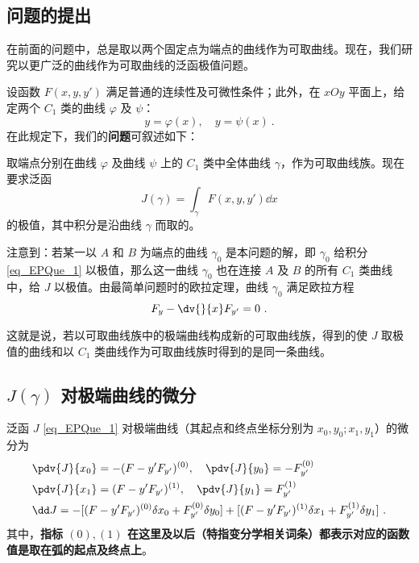 

\subsection{问题的提出}\label{sub_EPQue_1}在前面的问题中，总是取以两个固定点为端点的曲线作为可取曲线。现在，我们研究以更广泛的曲线作为可取曲线的泛函极值问题。

设函数 $F(x,y,y')$ 满足普通的连续性及可微性条件；此外，在 $xOy$ 平面上，给定两个 $C_1$ 类的曲线 $\varphi$ 及 $\psi$：
\begin{equation}
y=\varphi(x),\quad y=\psi(x)~.
\end{equation}
在此规定下，我们的\textbf{问题}可叙述如下：

取端点分别在曲线 $\varphi$ 及曲线 $\psi$ 上的 $C_1$ 类中全体曲线 $\gamma$，作为可取曲线族。现在要求泛函
\begin{equation}\label{eq_EPQue_1}
J(\gamma)=\int_\gamma F(x,y,y')\dd x
\end{equation}
的极值，其中积分是沿曲线 $\gamma$ 而取的。

注意到：若某一以 $A$ 和 $B$ 为端点的曲线 $\gamma_0$ 是本问题的解，即 $\gamma_0$ 给积分\autoref{eq_EPQue_1} 以极值，那么这一曲线 $\gamma_0$ 也在连接 $A$ 及 $B$ 的所有 $C_1$ 类曲线中，给 $J$ 以极值。由最简单问题时的欧拉定理，曲线 $\gamma_0$ 满足欧拉方程
\begin{equation}
F_y-\dv{}{x}F_{y'}=0~.
\end{equation}

这就是说，若以可取曲线族中的极端曲线构成新的可取曲线族，得到的使 $J$ 取极值的曲线和以 $C_1$ 类曲线作为可取曲线族时得到的是同一条曲线。
\subsection{$J(\gamma)$ 对极端曲线的微分} 
\begin{theorem}{}\label{the_EPQue_1}
泛函 $J$ \autoref{eq_EPQue_1} 对极端曲线（其起点和终点坐标分别为 $x_0,y_0;x_1,y_1$）的微分为
\begin{equation}\label{eq_EPQue_5}
\begin{aligned}
&\pdv{J}{x_0}=-(F-y'F_{y'})^{(0)},\quad \pdv{J}{y_0}=-F_{y'}^{(0)}\\
&\pdv{J}{x_1}=(F-y'F_{y'})^{(1)},\quad \pdv{J}{y_1}=F_{y'}^{(1)}\\
&\dd J=-[(F-y'F_{y'})^{(0)}\delta {x_0}+ F_{y'}^{(0)}\delta y_0]+[(F-y'F_{y'})^{(1)}\delta {x_1}+F_{y'}^{(1)}\delta y_1]~.
\end{aligned}
\end{equation}
其中，\textbf{指标 ${(0)},{(1)}$ 在这里及以后（特指变分学相关词条）都表示对应的函数值是取在弧的起点及终点上}。
\end{theorem}
